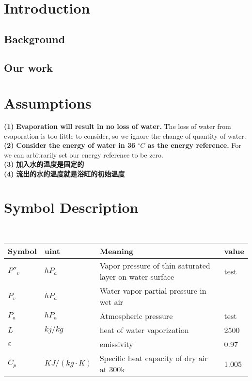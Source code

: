 \documentclass{mcmthesis}
\begin{document}
\setcounter{page}{1}
\section{Introduction}
\subsection{Background}%

\subsection{Our work}


\section{Assumptions}
\noindent
{\bf (1) } \textbf{Evaporation will result in no loss of water.} The loss of water from evaporation is too little to consider, so we ignore the change of quantity of water.\\
{\bf (2) } \textbf{Consider the energy of water in 36 ${^\circ}C$ as the energy reference.} For we can arbitrarily set our energy reference to be zero.\\
{\bf (3) } \textbf{加入水的温度是固定的} \\
{\bf (4) } \textbf{流出的水的温度就是浴缸的初始温度} \\

\section{Symbol Description}
\begin{table}[H]
        \setlength{\abovecaptionskip}{0pt}
        \setlength{\belowcaptionskip}{0pt}
				\\
        \begin{tabular}{p{2cm}|p{2cm}|p{7.5cm}|p{1.7cm}}
		\hline
		\rowcolor[gray]{0.9}\bf{Symbol}	&\bf{uint}      &\bf{Meaning}&\bf{value}	\\
		\hline
		${P}''_{v}$		& $hP_{a}$		 & Vapor pressure of thin saturated layer on water surface  &test\\
		$P_{v}$		& $hP_{a}$		 & Water vapor partial pressure in wet air\\
		$P_{a}$		& $hP_{a}$		 & Atmospheric pressure  &test\\
		$L$		& $kj/kg$		 & heat of water vaporization&2500\\
		$\varepsilon$		& 		 & emissivity&0.97\\
		$C_{p}$		& $KJ/(kg\cdot K)$		 & Specific heat capacity of dry air at 300k &1.005\\
		\hline
		\end{tabular}
	\end{table}
\end{document}
